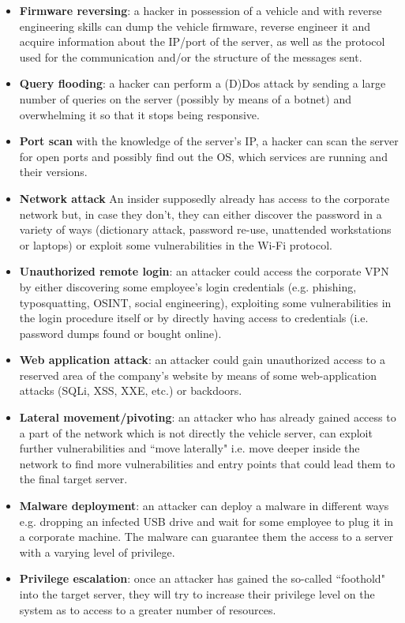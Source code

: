 \begin{itemize}
	\item \textbf{Firmware reversing}: a hacker in possession of a vehicle and with reverse engineering skills can dump the vehicle firmware, reverse engineer it and acquire information about the IP/port of the server, as well as the protocol used for the communication and/or the structure of the messages sent.
	\item \textbf{Query flooding}: a hacker can perform a (D)Dos attack by sending a large number of queries on the server (possibly by means of a botnet) and overwhelming it so that it stops being responsive.
	\item \textbf{Port scan} with the knowledge of the server's IP, a hacker can scan the server for open ports and possibly find out the OS, which services are running and their versions.
	\item \textbf{Network attack} An insider supposedly already has access to the corporate network but, in case they don't, they can either discover the password in a variety of ways (dictionary attack, password re-use, unattended workstations or laptops) or exploit some vulnerabilities in the Wi-Fi protocol.
	\item \textbf{Unauthorized remote login}: an attacker could access the corporate VPN by either discovering some employee's login credentials (e.g. phishing, typosquatting, OSINT, social engineering), exploiting some vulnerabilities  in the login procedure itself or by directly having access to credentials (i.e. password dumps found or bought online).
	\item \textbf{Web application attack}: an attacker could gain unauthorized access to a reserved area of the company's website by means of some web-application attacks (SQLi, XSS, XXE, etc.) or backdoors.
	\item \textbf{Lateral movement/pivoting}: an attacker who has already gained access to a part of the network which is not directly the vehicle server, can exploit further vulnerabilities and ``move laterally" i.e. move deeper inside the network to find more vulnerabilities and entry points that could lead them to the final target server.
	\item \textbf{Malware deployment}: an attacker can deploy a malware in different ways e.g. dropping an infected USB drive and wait for some employee to plug it in a corporate machine. The malware can guarantee them the access to a server with a varying level of privilege.
	\item \textbf{Privilege escalation}: once an attacker has gained the so-called ``foothold" into the target server, they will try to increase their privilege level on the system as to access to a greater number of resources.

\end{itemize}
